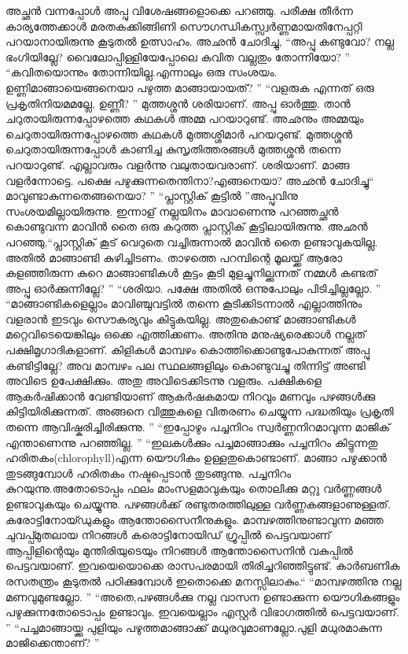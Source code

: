 അച്ഛൻ വന്നപ്പോൾ അപ്പു വിശേഷങ്ങളൊക്കെ പറഞ്ഞു. പരീക്ഷ തീർന്ന കാര്യത്തേക്കാൾ മരതകക്കിങ്ങിണി സൌഗന്ധികസ്സ്വർണ്ണമായതിനേപ്പറ്റി പറയാനായിരുന്നു കൂടുതൽ ഉത്സാഹം.
അഛൻ ചോദിച്ചു, “അപ്പു കണ്ടുവോ? നല്ല ഭംഗിയില്ലേ? വൈലോപ്പിള്ളിയേപ്പോലെ കവിത വല്ലതും തോന്നിയോ? ”
“കവിതയൊന്നും തോന്നിയില്ല.എന്നാലും ഒരു സംശയം. ഉണ്ണിമാങ്ങായെങ്ങനെയാ പഴുത്ത മാങ്ങായായത്? ”
“വളരുക എന്നത് ഒരു പ്രകൃതിനിയമമല്ലേ, ഉണ്ണീ? ” മുത്തശ്ശൻ
 ശരിയാണ്‌. അപ്പു ഓർത്തു. താൻ ചറുതായിരുന്നപ്പോഴത്തെ കഥകൾ അമ്മ പറയാറുണ്ട്. അഛനും അമ്മയും ചെറുതായിരുന്നപ്പോഴത്തെ കഥകൾ മുത്തശ്ശിമാർ പറയറുണ്ട്. മുത്തശ്ശൻ ചെറുതായിരുന്നപ്പോൾ കാണിച്ച കുസൃതിത്തരങ്ങൾ മുത്തശ്ശൻ തന്നെ പറയാറുണ്ട്. എല്ലാവരും വളർന്നു വലുതായവരാണ്‌. ശരിയാണ്‌.  മാങ്ങ വളർന്നോട്ടെ. പക്ഷെ പഴുക്കുന്നതെന്തിനാ?എങ്ങനെയാ?
അഛൻ ചോദിച്ചു“ മാവുണ്ടാകുന്നതെങ്ങനെയാ? ”
“പ്ലാസ്റ്റിക് കൂട്ടിൽ ”അപ്പുവിനു സംശയമില്ലായിരുന്നു. ഇന്നാള് നല്ലയിനം മാവാണെന്നു പറഞ്ഞച്ഛൻ കൊണ്ടുവന്ന മാവിൻ തൈ ഒരു കറുത്ത പ്ലാസ്റ്റിക് കൂട്ടിലായിരുന്നു.
അഛൻ പറഞ്ഞു,“പ്ലാസ്റ്റിക് കൂട് വെറുതെ വച്ചിരുന്നാൽ മാവിൻ തൈ ഉണ്ടാവുകയില്ല. അതിൽ മാങ്ങാണ്ടി കുഴിച്ചിടണം. താഴത്തെ പറമ്പിന്റെ മൂലയ്ക്ക് ആരോ കളഞ്ഞിരുന്ന കുറെ മാങ്ങാണ്ടികൾ കൂട്ടം കൂടി മുളച്ചുനില്ക്കുന്നത് നമ്മൾ കണ്ടത് അപ്പു ഓർക്കുന്നില്ലേ? ”
“ശരിയാ. പക്ഷേ അതിൽ ഒന്നുപോലും പിടിച്ചില്ലല്ലോ. ”
“മാങ്ങാണ്ടികളെല്ലാം മാവിഞ്ചുവട്ടിൽ തന്നെ കൂടിക്കിടന്നാൽ എല്ലാത്തിനും വളരാൻ ഇടവും സൌകര്യവും കിട്ടുകയില്ല. അതുകൊണ്ട് മാങ്ങാണ്ടികൾ മറ്റെവിടെയെങ്കിലും ഒക്കെ എത്തിക്കണം. അതിനു മനുഷ്യരെക്കാൾ നല്ലത് പക്ഷിമൃഗാദികളാണ്‌. കിളികൾ മാമ്പഴം കൊത്തിക്കൊണ്ടുപോകുന്നത് അപ്പു കണ്ടിട്ടില്ലേ? അവ മാമ്പഴം പല സ്ഥലങ്ങളിലും കൊണ്ടുവച്ചു തിന്നിട്ട് അണ്ടി അവിടെ ഉപേക്ഷിക്കും. അതു അവിടെക്കിടന്നു വളരും. പക്ഷികളെ ആകർഷിക്കാൻ വേണ്ടിയാണ്‌ ആകർഷകമായ നിറവും മണവും പഴങ്ങൾക്കു കിട്ടിയിരിക്കുന്നത്. അങ്ങനെ വിത്തുകളെ വിതരണം ചെയ്യുന്ന പദ്ധതിയും പ്രകൃതി തന്നെ ആവിഷ്കരിച്ചിരിക്കുന്നു. ”
“ഇപ്പോഴും പച്ചനിറം സ്വർണ്ണനിറമാവുന്ന മാജിക് എന്താണെന്നു പറഞ്ഞില്ല. ”
“ഇലകൾക്കും പച്ചമാങ്ങാക്കും പച്ചനിറം കിട്ടുന്നതു ഹരിതകം(chlorophyll)എന്ന യൌഗികം ഉള്ളതുകൊണ്ടാണ്‌. മാങ്ങാ പഴുക്കാൻ തുടങ്ങുമ്പോൾ ഹരിതകം നഷ്ടപ്പെടാൻ തുടങ്ങുന്നു. പച്ചനിറം കുറയുന്നു.അതോടൊപ്പം ഫലം മാംസളമാവുകയും തൊലിക്കു മറ്റു വർണ്ണങ്ങൾ ഉണ്ടാവുകയും ചെയ്യുന്നു. പഴങ്ങൾക്ക് രണ്ടുതരത്തിലുള്ള വർണ്ണകങ്ങളാണുള്ളത്. കരോട്ടിനോയ്ഡുകളും ആന്തോസൈനീനുകളും. മാമ്പഴത്തിനുണ്ടാവുന്ന മഞ്ഞ ചുവപ്പ്മുതലായ നിറങ്ങൾ കരൊട്ടിനോയിഡ് ഗ്രൂപ്പിൽ പെട്ടവയാണ് ആപ്പിളിന്റെയും മുന്തിരിയുടെയും നിറങ്ങൾ ആന്തോസൈനിൻ വകുപ്പിൽ പെട്ടവയാണ്‌. ഇവയെയൊക്കെ രാസപരമായി തിരിച്ചറിഞ്ഞിട്ടുണ്ട്. കാർബണിക രസതന്ത്രം കൂടുതൽ പഠിക്കുമ്പോൾ ഇതൊക്കെ മനസ്സിലാകും.“
“മാമ്പഴത്തിനു നല്ല മണവുമുണ്ടല്ലോ. ”
“അതെ,പഴങ്ങൾക്കു നല്ല വാസന ഉണ്ടാക്കുന്ന യൌഗികങ്ങളും പഴുക്കുന്നതോടൊപ്പം ഉണ്ടാവും. ഇവയെല്ലാം എസ്റ്റർ വിഭാഗത്തിൽ പെട്ടവയാണ്‌. ”
“പച്ചമാങ്ങായ്ക്കു പുളിയും പഴുത്തമാങ്ങാക്ക് മധുരവുമാണല്ലോ.പുളി മധുരമാകുന്ന മാജിക്കെന്താണ്‌? ”
